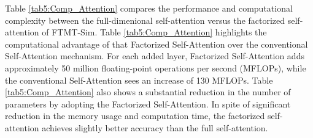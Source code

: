 \begin{table}[t]
    \begin{center}
    \caption{Comparison of computational complexity between factorized Self-Attention versus full self-attention on the UTD-MHAD dataset}
    \label{tab5:Comp_Attention}
    \end{center}
\end{table}

Table \ref{tab5:Comp_Attention} compares the performance and computational complexity between the full-dimenional self-attention versus the factorized self-attention of FTMT-Sim.  
Table \ref{tab5:Comp_Attention} highlights the computational advantage of that Factorized Self-Attention over the conventional Self-Attention mechanism. For each added layer, Factorized Self-Attention adds approximately 50 million floating-point operations per second (MFLOPs), while the conventional Self-Attention sees an increase of 130 MFLOPs. 
Table \ref{tab5:Comp_Attention} also shows a substantial reduction in the number of parameters by adopting the Factorized Self-Attention. 
In spite of significant reduction in the memory usage and computation time, the factorized self-attention achieves slightly better accuracy than the full self-attention. 